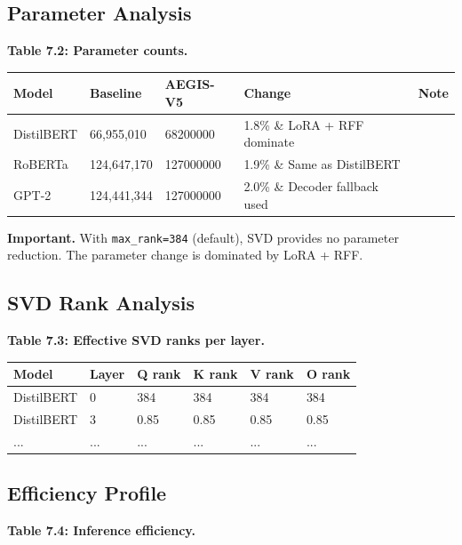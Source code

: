 \subsection{Parameter Analysis}

\textbf{Table 7.2: Parameter counts.}

\begin{table}[H]
\centering
\small
\begin{tabular}{lllll}
\toprule
\textbf{Model} & \textbf{Baseline} & \textbf{AEGIS-V5} & \textbf{Change} & \textbf{Note} \\
\midrule
DistilBERT & 66,955,010 & 68200000 & 1.8\% \& LoRA + RFF dominate \\
RoBERTa & 124,647,170 & 127000000 & 1.9\% \& Same as DistilBERT \\
GPT-2 & 124,441,344 & 127000000 & 2.0\% \& Decoder fallback used \\
\bottomrule
\end{tabular}
\end{table}

\textbf{Important.} With \texttt{max\_rank=384} (default), SVD provides no parameter 
reduction. The parameter change is dominated by LoRA + RFF.

\subsection{SVD Rank Analysis}

\textbf{Table 7.3: Effective SVD ranks per layer.}

\begin{table}[H]
\centering
\small
\begin{tabular}{llllll}
\toprule
\textbf{Model} & \textbf{Layer} & \textbf{Q rank} & \textbf{K rank} & \textbf{V rank} & \textbf{O rank} \\
\midrule
DistilBERT & 0 & 384 & 384 & 384 & 384 \\
DistilBERT & 3 & 0.85 & 0.85 & 0.85 & 0.85 \\
... & ... & ... & ... & ... & ... \\
\bottomrule
\end{tabular}
\end{table}

\subsection{Efficiency Profile}

\textbf{Table 7.4: Inference efficiency.}

